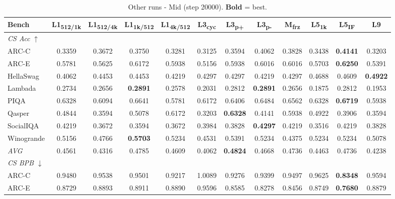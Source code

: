\begin{table}[htbp]
\centering
\setlength{\tabcolsep}{2.5pt}
\small
\caption{Other runs - Mid (step 20000). \textbf{Bold} = best.}
\label{tab:other_mid}
\begin{tabular}{lccccccccccc}
\toprule
Bench & L1\textsubscript{512/1k} & L1\textsubscript{512/4k} & L1\textsubscript{1k/512} & L1\textsubscript{4k/512} & L3\textsubscript{cyc} & L3\textsubscript{p+} & L3\textsubscript{p-} & M\textsubscript{frz} & L5\textsubscript{1k} & L5\textsubscript{IF} & L9 \\
\midrule
\multicolumn{12}{l}{\textit{CS Acc} $\uparrow$} \\
ARC-C & 0.3359 & 0.3672 & 0.3750 & 0.3281 & 0.3125 & 0.3594 & 0.4062 & 0.3828 & 0.3438 & \textbf{0.4141} & 0.3203 \\
ARC-E & 0.5781 & 0.5625 & 0.6172 & 0.5938 & 0.5156 & 0.5938 & 0.6016 & 0.6016 & 0.5703 & \textbf{0.6250} & 0.5391 \\
HellaSwag & 0.4062 & 0.4453 & 0.4453 & 0.4219 & 0.4297 & 0.4297 & 0.4219 & 0.4297 & 0.4688 & 0.4609 & \textbf{0.4922} \\
Lambada & 0.2734 & 0.2656 & \textbf{0.2891} & 0.2578 & 0.2031 & 0.2812 & \textbf{0.2891} & 0.2656 & 0.1875 & 0.2812 & 0.1953 \\
PIQA & 0.6328 & 0.6094 & 0.6641 & 0.5781 & 0.6172 & 0.6406 & 0.6484 & 0.6562 & 0.6328 & \textbf{0.6719} & 0.5938 \\
Qasper & 0.4844 & 0.3594 & 0.5078 & 0.6172 & 0.3203 & \textbf{0.6328} & 0.4141 & 0.5938 & 0.4922 & 0.3906 & 0.3594 \\
SocialIQA & 0.4219 & 0.3672 & 0.3594 & 0.3672 & 0.3984 & 0.3828 & \textbf{0.4297} & 0.4219 & 0.3516 & 0.4219 & 0.3828 \\
Winogrande & 0.5156 & 0.4766 & \textbf{0.5703} & 0.5234 & 0.4531 & 0.5391 & 0.5234 & 0.4375 & 0.5234 & 0.5234 & 0.5078 \\
\textit{AVG} & 0.4561 & 0.4316 & 0.4785 & 0.4609 & 0.4062 & \textbf{0.4824} & 0.4668 & 0.4736 & 0.4463 & 0.4736 & 0.4238 \\
\midrule
\multicolumn{12}{l}{\textit{CS BPB} $\downarrow$} \\
ARC-C & 0.9480 & 0.9538 & 0.9501 & 0.9217 & 1.0089 & 0.9276 & 0.9399 & 0.9497 & 0.9625 & \textbf{0.8348} & 0.9594 \\
ARC-E & 0.8729 & 0.8893 & 0.8911 & 0.8890 & 0.9596 & 0.8585 & 0.8278 & 0.8456 & 0.8749 & \textbf{0.7680} & 0.8879 \\

\end{tabular}
\end{table}
